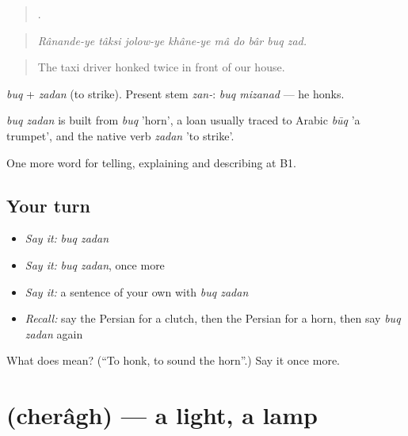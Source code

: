\begin{quote}
        .
\end{quote}

\begin{quote}
\emph{Rânande-ye tâksi jolow-ye khâne-ye mâ do bâr buq zad.}
\end{quote}

\begin{quote}
The taxi driver honked twice in front of our house.
\end{quote}

\emph{buq} + \emph{zadan} (to strike). Present stem \emph{zan-}: \emph{buq mizanad} — he honks.

\begin{cousinweb}
\emph{buq zadan} is built from \emph{buq} 'horn', a loan usually traced to Arabic \emph{būq} 'a trumpet', and the native verb \emph{zadan} 'to strike'.
\end{cousinweb}

\begin{grammarlens}[title={What you've built}]
One more word for telling, explaining and describing at B1.
\end{grammarlens}

\subsection*{Your turn}
\begin{itemize}
\raggedright
  \item \emph{Say it:} \emph{buq zadan}
  \item \emph{Say it:} \emph{buq zadan}, once more
  \item \emph{Say it:} a sentence of your own with \emph{buq zadan}
  \item \emph{Recall:} say the Persian for a clutch, then the Persian for a horn, then say \emph{buq zadan} again
\end{itemize}

\begin{tcolorbox}[breakable,colback=teal!4,colframe=teal!35!black,title={Before you move on}]
What does   mean? (\textquotedblleft{}To honk, to sound the horn\textquotedblright{}.) Say it once more.
\end{tcolorbox}
\section[\texorpdfstring{\fa{چراغ} (cherâgh)}{چراغ (cherâgh)}]{ (cherâgh) — a light, a lamp}


